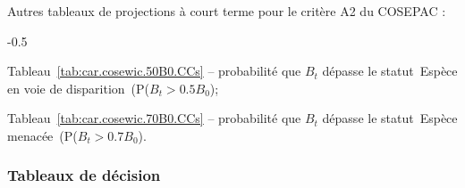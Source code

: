 \documentclass[11pt]{book}
\newcommand{\pc}{\%}
\newcommand{\angL}{\guillemotleft\,}
\newcommand{\angR}{\,\guillemotright}
\begin{document}
Autres tableaux de projections \`{a} court terme pour le crit\`{e}re A2 du COSEPAC :
\begin{itemize_csas}{-0.5}{}
\item Tableau~\ref{tab:car.cosewic.50B0.CCs}  -- probabilit\'{e} que $B_t$ d\'{e}passe le statut \angL{}Esp\`{e}ce en voie de disparition\angR{} (P($B_t > 0.5B_0$);
\item Tableau~\ref{tab:car.cosewic.70B0.CCs}  -- probabilit\'{e} que $B_t$ d\'{e}passe le statut \angL{}Esp\`{e}ce menac\'{e}e\angR{} (P($B_t > 0.7B_0$).
\end{itemize_csas}


\subsubsection{Tableaux de d\'{e}cision}

\setlength{\tabcolsep}{0pt}%
\renewcommand*{\arraystretch}{1.0}
\end{document}
